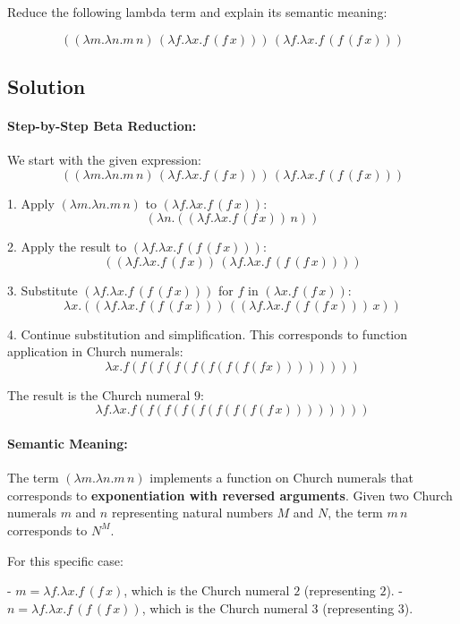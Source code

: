 \documentclass{article}
\theoremstyle{theorem}
\theoremstyle{definition}
\theoremstyle{remark}
\begin{document}
Reduce the following lambda term and explain its semantic meaning:

\[
((\lambda m. \lambda n. m \, n) \, (\lambda f. \lambda x. f \, (f \, x))) \, (\lambda f. \lambda x. f \, (f \, (f \, x)))
\]

\subsection*{Solution}

\paragraph{Step-by-Step Beta Reduction:}

We start with the given expression:
\[
((\lambda m. \lambda n. m \, n) \, (\lambda f. \lambda x. f \, (f \, x))) \, (\lambda f. \lambda x. f \, (f \, (f \, x)))
\]

1. Apply \((\lambda m. \lambda n. m \, n)\) to \((\lambda f. \lambda x. f \, (f \, x))\):
\[
(\lambda n. ((\lambda f. \lambda x. f \, (f \, x)) \, n))
\]

2. Apply the result to \((\lambda f. \lambda x. f \, (f \, (f \, x)))\):
\[
((\lambda f. \lambda x. f \, (f \, x)) \, (\lambda f. \lambda x. f \, (f \, (f \, x))))
\]

3. Substitute \((\lambda f. \lambda x. f \, (f \, (f \, x)))\) for \(f\) in \((\lambda x. f \, (f \, x))\):
\[
\lambda x. ((\lambda f. \lambda x. f \, (f \, (f \, x))) \, ((\lambda f. \lambda x. f \, (f \, (f \, x))) \, x))
\]

4. Continue substitution and simplification. This corresponds to function application in Church numerals:
\[
\lambda x. f (f (f (f (f (f (f (f (f x))))))))
\]

The result is the Church numeral \(9\):
\[
\lambda f. \lambda x. f (f (f (f (f (f (f (f (f \, x))))))))
\]

\paragraph{Semantic Meaning:}

The term \((\lambda m. \lambda n. m \, n)\) implements a function on Church numerals that corresponds to \textbf{exponentiation with reversed arguments}. Given two Church numerals \(m\) and \(n\) representing natural numbers \(M\) and \(N\), the term \(m \, n\) corresponds to \(N^M\).

For this specific case:

- \(m = \lambda f. \lambda x. f \, (f \, x)\), which is the Church numeral \(2\) (representing \(2\)).
- \(n = \lambda f. \lambda x. f \, (f \, (f \, x))\), which is the Church numeral \(3\) (representing \(3\)).
\end{document}
